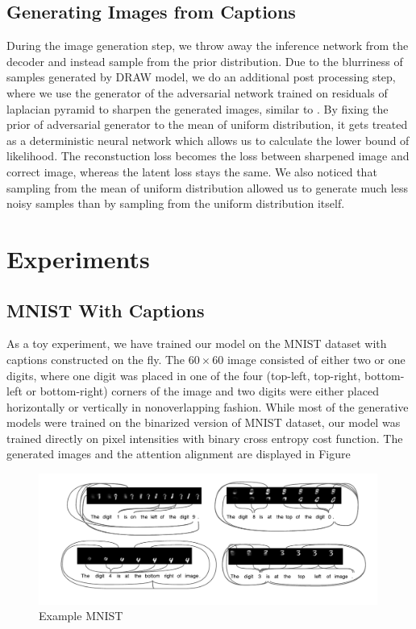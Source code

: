 \documentclass{article} %
\begin{document}
\subsection{Generating Images from Captions}

During the image generation step, we throw away the inference network from the decoder and instead sample from the prior distribution. Due to the blurriness of samples generated by DRAW model, we do an additional post processing step, where we use the generator of the adversarial network trained on residuals of laplacian pyramid to sharpen the generated images, similar to \citep{denton_lapgan}. By fixing the prior of adversarial generator to the mean of uniform distribution, it gets treated as a deterministic neural network which allows us to calculate the lower bound of likelihood. The reconstuction loss becomes the loss between sharpened image and correct image, whereas the latent loss stays the same. We also noticed that sampling from the mean of uniform distribution allowed us to generate much less noisy samples than by sampling from the uniform distribution itself.  

\section{Experiments}
\subsection{MNIST With Captions}
As a toy experiment, we have trained our model on the MNIST dataset with captions constructed on the fly. The $60 \times 60$ image consisted of either two or one digits, where one digit was placed in one of the four (top-left, top-right, bottom-left or bottom-right) corners of the image and two digits were either placed horizontally or vertically in nonoverlapping fashion. While most of the generative models were trained on the binarized version of MNIST dataset, our model was trained directly on pixel intensities with binary cross entropy cost function. The generated images and the attention alignment are displayed in Figure

\begin{figure}[!t]
\captionsetup[subfigure]{labelformat=empty}
\begin{center}
\includegraphics[width=0.99\textwidth]{figures/new/mnist/prototype3.pdf}\quad
%
\end{center}
\caption{Example MNIST}
\label{fig:figmnist}
\vspace{-0.3cm}
\end{figure}
\end{document}
